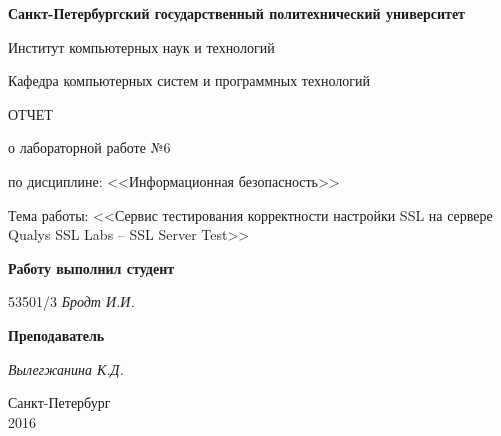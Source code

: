 \begin{titlepage}
\begin{center}

\textbf{Санкт-Петербургский государственный политехнический университет}

\vspace{5mm}
Институт компьютерных наук и технологий

\vspace{5mm}
Кафедра компьютерных систем и программных технологий

\vspace*{\fill}

\huge{ОТЧЕТ}

\Large{о лабораторной работе №6}
\vspace{2mm}

\large{по дисциплине: <<Информационная безопасность>>}

\vspace*{2mm}
\large{Тема работы: <<Сервис тестирования корректности настройки SSL на сервере Qualys SSL Labs – SSL Server Test>>}

\vspace*{\fill}
\end{center}

\begin{large}
\hspace{0.35\linewidth} \textbf{Работу выполнил студент}

\vspace{5mm}
\hspace{0.35\linewidth} 53501/3 \hspace{1cm} \textit{Бродт И.И.}

\vspace{3mm}
\hspace{0.35\linewidth} \textbf{Преподаватель}

\vspace{5mm}
\hspace{0.35\linewidth} \underline{\hspace{2cm} } \hspace{3mm} \textit{Вылегжанина К.Д.}
\end{large}

\vspace*{3cm}

\begin{center}
\normalsize Санкт-Петербург\\2016
\end{center}
\end{titlepage}